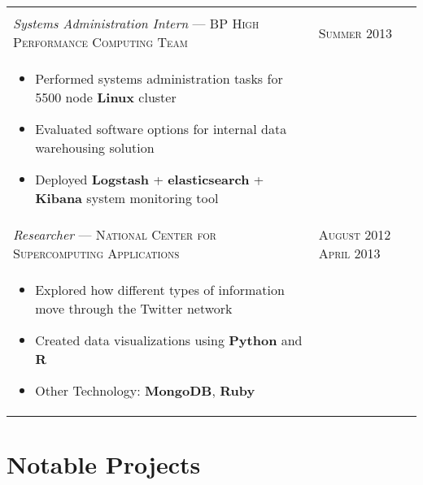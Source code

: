 \documentclass[letterpaper,10pt]{article}
\begin{document}
\begin{tabular}{p{13.5cm}>{\raggedleft\arraybackslash}p{2.5cm}}
\begin{itemize}
    \end{itemize} \\

    \emph{Systems Administration Intern} --- \textsc{BP High Performance Computing Team} &
    \textsc{Summer 2013} \\

    \vspace{-2mm}
    \begin{itemize}
        \item
            Performed systems administration tasks for 5500 node \textbf{Linux} cluster
        \item
            Evaluated software options for internal data warehousing solution
        \item
            Deployed \textbf{Logstash} + \textbf{elasticsearch} +
            \textbf{Kibana} system monitoring tool
    \end{itemize} \\

    \emph{Researcher} --- \textsc{National Center for Supercomputing Applications} &
    \textsc{August 2012 April 2013} \\

    \vspace{-6mm}
    \begin{itemize}
        \item
            Explored how different types of information move through the Twitter network
        \item
            Created data visualizations using \textbf{Python} and \textbf{R}
        \item
            Other Technology: \textbf{MongoDB}, \textbf{Ruby}
    \end{itemize}
\end{tabular}

\section{Notable Projects}
\end{document}
